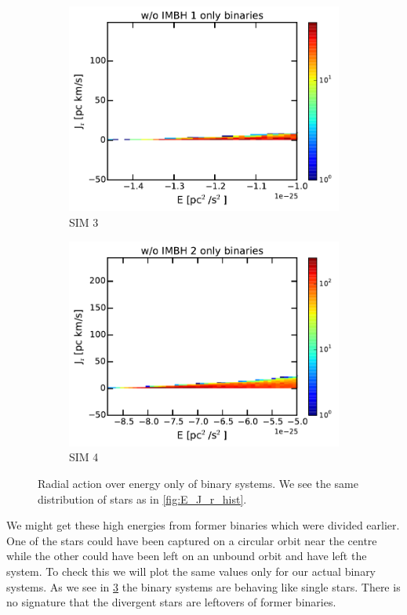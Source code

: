 \begin{figure}[htbp]
\begin{subfigure}{0.475\textwidth}
		\includegraphics[width=\textwidth]{Plots/E_J_r_hist_bins_noIMBH1.pdf}
		\caption{SIM 3}
		\label{fig:E_J_r_hist_bins_noIMBH1}
	\end{subfigure}
	\hfill
	\begin{subfigure}{0.475\textwidth}
		\includegraphics[width=\textwidth]{Plots/E_J_r_hist_bins_noIMBH2.pdf}
		\caption{SIM 4}
		\label{fig:E_J_r_hist_bins_noIMBH2}
	\end{subfigure}
	\caption{Radial action over energy only of binary systems. We see the same distribution of stars as in \ref{fig:E_J_r_hist}.}
	\label{fig:E_J_r_bins_hist}
\end{figure}

\par We might get these high energies from former binaries which were divided earlier. One of the stars could have been captured on a circular orbit near the centre while the other could have been left on an unbound orbit and have left the system. To check this we will plot the same values only for our actual binary systems. As we see in \ref{fig:E_J_r_bins_hist} the binary systems are behaving like single stars. There is no signature that the divergent stars are leftovers of former binaries. 

